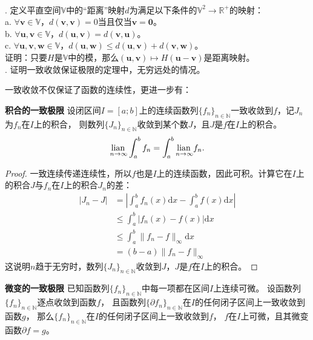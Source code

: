 \documentclass[12pt,UTF8]{ctexbook}
\begin{document}
\begin{appendix}
\begin{xt}
    \mbox{} \\
    . 定义平直空间$\mathbb{V}$中的“距离”映射$d$为满足以下条件的$\mathbb{V}^2 \rightarrow \mathbb{R}^+$的映射：\\
    \indent \indent a. $\forall \mathbf{v} \in \mathbb{V}$，$d(\mathbf{v}, \mathbf{v}) = 0$当且仅当$\mathbf{v} = \mathbf{0}$。\\
    \indent \indent b. $\forall \mathbf{u}, \mathbf{v} \in \mathbb{V}$，$d(\mathbf{u}, \mathbf{v}) = d(\mathbf{v}, \mathbf{u})$。\\
    \indent \indent c. $\forall \mathbf{u}, \mathbf{v}, \mathbf{w} \in \mathbb{V}$，$d(\mathbf{u}, \mathbf{w}) \leqslant d(\mathbf{u}, \mathbf{v}) + d(\mathbf{v}, \mathbf{w})$。\\
    \indent 证明：只要$H$是$\mathbb{V}$中的模，那么$(\mathbf{u}, \mathbf{v})\mapsto H(\mathbf{u} - \mathbf{v})$是距离映射。\\
    . 证明一致收敛保证极限的定理中，无穷远处的情况。
\end{xt}

一致收敛不仅保证了函数的连续性，更进一步有：

\begin{tm}{\textbf{积合的一致极限}}
    设闭区间$I=[a;b]$上的连续函数列$\{f_n\}_{n\in\mathbb{N}}$一致收敛到$f$，记$J_n$为$f_n$在$I$上的积合，
    则数列$\{J_n\}_{n\in\mathbb{N}}$收敛到某个数$J$，且$J$是$f$在$I$上的积合。
    $$ \underset{n\to \infty}{\operatorname{lian}\,} \int_a^b f_n = \int_a^b \underset{n\to\infty}{\operatorname{lian}\,} f_n. $$
\end{tm}

\begin{proof}
    一致连续传递连续性，所以$f$也是$I$上的连续函数，因此可积。计算它在$I$上的积合$J$与$f_n$在$I$上的积合$J_n$的差：
    \begin{align*}
        |J_n - J| &= \left|\int_a^b f_n(x)\mathrm{d}x - \int_a^b f(x)\mathrm{d}x \right| \\
        &\leqslant \int_a^b \left| f_n(x) - f(x)\right| \mathrm{d}x \\
        &\leqslant \int_a^b \| f_n - f\|_{\infty} \mathrm{d}x \\
        &= (b - a) \| f_n - f\|_{\infty}
    \end{align*}
    这说明$n$趋于无穷时，数列$\{J_n\}_{n\in\mathbb{N}}$收敛到$J$，$J$是$f$在$I$上的积合。

\end{proof}

\begin{tm}{\textbf{微变的一致极限}}
    已知函数列$\{f_n\}_{n\in\mathbb{N}}$中每一项都在区间$I$上连续可微。
    设函数列$\{f_n\}_{n\in\mathbb{N}}$逐点收敛到函数$f$，
    且函数列$\{\partial f_n\}_{n\in\mathbb{N}}$在$I$的任何闭子区间上一致收敛到函数$g$，
    那么$\{f_n\}_{n\in\mathbb{N}}$在$I$的任何闭子区间上一致收敛到$f$，
    $f$在$I$上可微，且其微变函数$\partial f = g$。


\end{tm}
\end{appendix}
\end{document}
